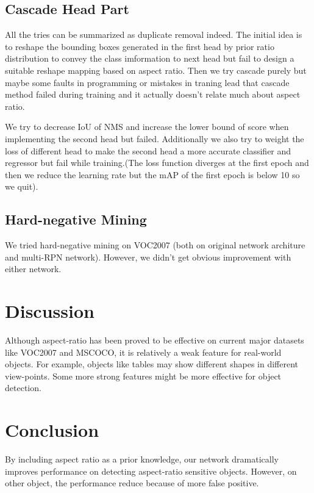 \documentclass[10pt,twocolumn,letterpaper]{article}
\begin{document}
\subsection{Cascade Head Part}
\par
All the tries can be summarized as duplicate removal indeed. The initial idea is to reshape the bounding boxes generated in the first head by prior ratio distribution to convey the class imformation to next head but fail to design a suitable reshape mapping based on aspect ratio. Then we try cascade purely but maybe some faults in programming or mistakes in traning lead that cascade method failed during training and it actually doesn't relate much about aspect ratio.
\par
We try to decrease IoU of NMS and increase the lower bound of score when implementing the second head but failed. Additionally we also try to weight the loss of different head to make the second head a more accurate classifier and regressor but fail while training.(The loss function diverges at the first epoch and then we reduce the learning rate but the mAP of the first epoch is below 10 so we quit).

\subsection{Hard-negative Mining}
We tried hard-negative mining on VOC2007 (both on original network architure and multi-RPN network). However, we didn't get obvious improvement with either network. 


\section{Discussion}
\par
Although aspect-ratio has been proved to be effective on current major datasets like VOC2007 and MSCOCO, it is relatively a weak feature for real-world objects. For example, objects like tables may show different shapes in different view-points. Some more strong features might be more effective for object detection.  

\section{Conclusion}
By including aspect ratio as a prior knowledge, our network dramatically improves performance on detecting aspect-ratio sensitive objects. However, on other object, the performance reduce because of more false positive.
\end{document}
